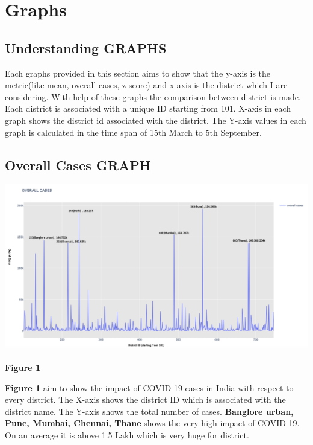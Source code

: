 \documentclass{report}
\begin{document}
\section{Graphs}
\subsection{Understanding GRAPHS}
\justify Each graphs provided in this section aims to show that the y-axis is the metric(like mean, overall cases, z-score) and x axis is the district which I are considering. With help of these graphs the comparison between district is made.
\newline
Each district is associated with a unique ID starting from 101. X-axis in each graph shows the district id associated with the district.
\newline 
The Y-axis values in each graph is calculated in the time span of 15th March to 5th September.

\subsection{Overall Cases GRAPH}
\includegraphics[scale=0.32]{OverallCases}
\centerline{\textbf{Figure 1}} \newline\newline
\justify \textbf{Figure 1} aim to show the impact of COVID-19 cases in India with respect to every district. The X-axis shows the district ID which is associated with the district name. The Y-axis shows the total number of cases. 
\newline \textbf{Banglore urban, Pune, Mumbai, Chennai, Thane} shows the very high impact of COVID-19. On an average it is above 1.5 Lakh which is very huge for district. 
    
\newpage
\end{document}

